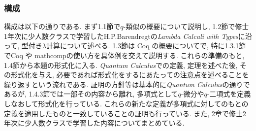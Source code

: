 \documentclass[11pt]{jsarticle}
\theoremstyle{mystyle}
\newcommand{\0}{\textbf{0}}
\begin{document}
\subsubsection*{構成}
構成は以下の通りである. 
まず1.1節で$q$-類似の概要について説明し, 
1.2節で修士1年次に少人数クラスで学習したH.P.Barendregtの{\it Lambda Calculi with Types}に沿って, 型付き$\lambda$計算について述べる. 
1.3節は Coq の概要についてで, 特に1.3.1節でCoq や mathcompの使い方を具体例を交えて説明する. 
これらの準備のもと, 1.4節から本題の形式化に入る. {\it Quantum Calculus}での定義, 定理を述べた後, その形式化を与え, 必要であれば形式化をするにあたっての注意点を述べることを繰り返すという流れである. 
証明の方針等は基本的に{\it Quantum Calculus}の通りであるが, 1.4.3節では一部その内容から離れ, 多項式として$q$-微分や$q$-二項式を定義しなおして形式化を行っている. これらの新たな定義が多項式に対してのもとの定義を適用したものと一致していることの証明も行っている. また, 2章で修士2年次に少人数クラスで学習した内容についてまとめている. 
\end{document}
